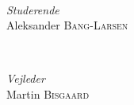 	\HRule\\[1.5cm]


	\begin{minipage}{0.4\textwidth}
		\begin{flushleft}
			\large
			\textit{Studerende}\\
			Aleksander \textsc{Bang-Larsen}\\ %
		\end{flushleft}
	\end{minipage}
	~
	\begin{minipage}{0.4\textwidth}
		\begin{flushright}
			\large
			\textit{Vejleder}\\
			Martin \textsc{Bisgaard} %
		\end{flushright}
	\end{minipage}





